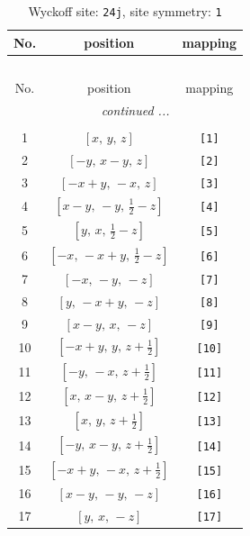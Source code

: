 \documentclass[fleqn,8pt]{jsarticle}
\begin{document}
\begin{longtable}{ccc}
\caption{Wyckoff site: {\tt 24j}, site symmetry: {\tt 1}}
 \\
 \hline \hline
No. & position & mapping \\ \hline \endfirsthead

\multicolumn{2}{l}{\tablename\ \thetable{}} \\
 \hline \hline
No. & position & mapping \\ \hline \endhead

 \hline \hline
\multicolumn{2}{r}{\footnotesize\it continued ...} \\ \endfoot

 \hline \hline
\multicolumn{2}{r}{} \\ \endlastfoot

1 & $\left[ x,\, y,\, z \right]$ & {\tt [1]} \\ \hline
2 & $\left[ - y,\, x - y,\, z \right]$ & {\tt [2]} \\ \hline
3 & $\left[ - x + y,\, - x,\, z \right]$ & {\tt [3]} \\ \hline
4 & $\left[ x - y,\, - y,\, \frac{1}{2} - z \right]$ & {\tt [4]} \\ \hline
5 & $\left[ y,\, x,\, \frac{1}{2} - z \right]$ & {\tt [5]} \\ \hline
6 & $\left[ - x,\, - x + y,\, \frac{1}{2} - z \right]$ & {\tt [6]} \\ \hline
7 & $\left[ - x,\, - y,\, - z \right]$ & {\tt [7]} \\ \hline
8 & $\left[ y,\, - x + y,\, - z \right]$ & {\tt [8]} \\ \hline
9 & $\left[ x - y,\, x,\, - z \right]$ & {\tt [9]} \\ \hline
10 & $\left[ - x + y,\, y,\, z + \frac{1}{2} \right]$ & {\tt [10]} \\ \hline
11 & $\left[ - y,\, - x,\, z + \frac{1}{2} \right]$ & {\tt [11]} \\ \hline
12 & $\left[ x,\, x - y,\, z + \frac{1}{2} \right]$ & {\tt [12]} \\ \hline
13 & $\left[ x,\, y,\, z + \frac{1}{2} \right]$ & {\tt [13]} \\ \hline
14 & $\left[ - y,\, x - y,\, z + \frac{1}{2} \right]$ & {\tt [14]} \\ \hline
15 & $\left[ - x + y,\, - x,\, z + \frac{1}{2} \right]$ & {\tt [15]} \\ \hline
16 & $\left[ x - y,\, - y,\, - z \right]$ & {\tt [16]} \\ \hline
17 & $\left[ y,\, x,\, - z \right]$ & {\tt [17]} \\ \hline

\end{longtable}
\end{document}
